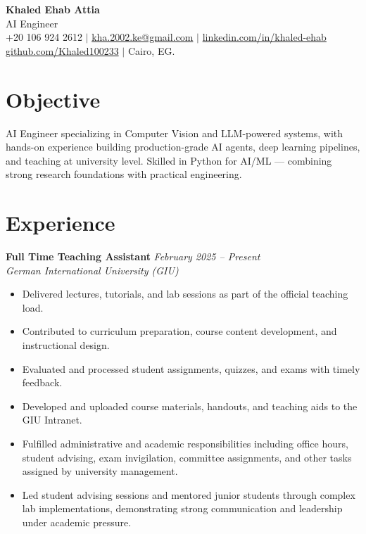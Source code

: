 \documentclass[a4paper,11pt]{article}
\newcommand{\cventry}[4]{%
  \textbf{#1} \hfill \textit{#3} \\
  \textit{#2} \hfill \textit{#4}
  \vspace{2pt}
}
\begin{document}
\begin{center}
  {\LARGE\bfseries Khaled Ehab Attia} \\[3pt]
  {\Large AI Engineer} \\[5pt]
  \small
  +20 106 924 2612 $|$
  \href{mailto:kha.2002.ke@gmail.com}{kha.2002.ke@gmail.com} $|$
  \href{http://www.linkedin.com/in/khaled-ehab}{linkedin.com/in/khaled-ehab} %
  \newline \href{https://github.com/Khaled100233}{github.com/Khaled100233} $|$
  Cairo, EG.
   

\end{center}

\vspace{4pt}

\section{Objective}

AI Engineer specializing in Computer Vision and LLM-powered systems, with hands-on experience building production-grade AI agents, deep learning pipelines, and teaching at university level. Skilled in Python for AI/ML — combining strong research foundations with practical engineering.

\section{Experience}



\cventry{Full Time Teaching Assistant}{German International University (GIU)}{February 2025 -- Present}{}
\begin{itemize}[leftmargin=1.5em, topsep=2pt, itemsep=1pt]
  \item Delivered lectures, tutorials, and lab sessions as part of the official teaching load.
  \item Contributed to curriculum preparation, course content development, and instructional design.
  \item Evaluated and processed student assignments, quizzes, and exams with timely feedback.
  \item Developed and uploaded course materials, handouts, and teaching aids to the GIU Intranet.
  \item Fulfilled administrative and academic responsibilities including office hours, student advising, exam invigilation, committee assignments, and other tasks assigned by university management.
  \item Led student advising sessions and mentored junior students through complex lab implementations, demonstrating strong communication and leadership under academic pressure.
\end{itemize}
\vspace{6pt}
\end{document}
